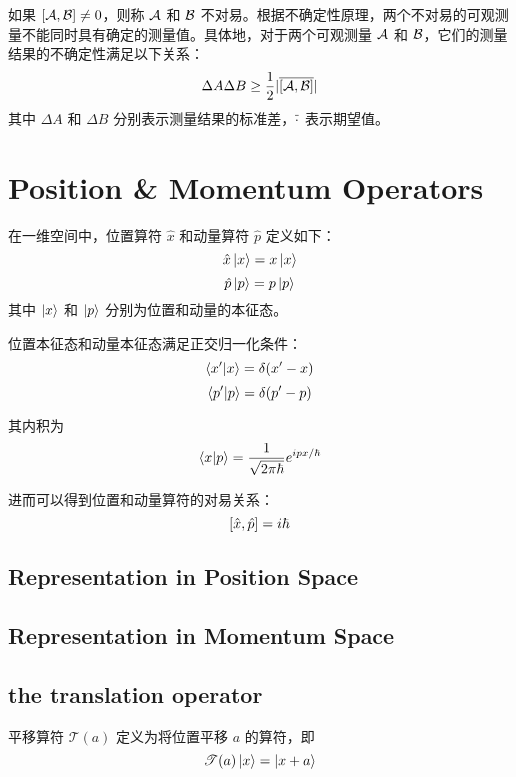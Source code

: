 如果 $\left[\mathcal{A},\mathcal{B}\right] \neq 0$，则称 $\mathcal{A}$ 和 $\mathcal{B}$ 不对易。根据不确定性原理，两个不对易的可观测量不能同时具有确定的测量值。具体地，对于两个可观测量 $\mathcal{A}$ 和 $\mathcal{B}$，它们的测量结果的不确定性满足以下关系：
\begin{equation}
    \Delta A \Delta B \geq \frac{1}{2} |\overline{\left[\mathcal{A},\mathcal{B}\right]}|
\end{equation}
其中 $\Delta A$ 和 $\Delta B$ 分别表示测量结果的标准差，$\overline{\cdot}$ 表示期望值。

\section{Position \& Momentum Operators}
在一维空间中，位置算符 $\hat{x}$ 和动量算符 $\hat{p}$ 定义如下：
\begin{equation}
    \hat{x}\left|x\right> = x\left|x\right>
\end{equation}
\begin{equation}
    \hat{p}\left|p\right> = p\left|p\right>
\end{equation}
其中 $\left|x\right>$ 和 $\left|p\right>$ 分别为位置和动量的本征态。

位置本征态和动量本征态满足正交归一化条件：
\begin{equation}
    \left<x'\middle|x\right> = \delta(x' - x)
\end{equation}
\begin{equation}
    \left<p'\middle|p\right> = \delta(p' - p)
\end{equation}

其内积为
\begin{equation}
    \left<x\middle|p\right> = \frac{1}{\sqrt{2\pi\hbar}} e^{ipx/\hbar}
\end{equation}

进而可以得到位置和动量算符的对易关系：
\begin{equation}
    \left[\hat{x},\hat{p}\right] = i\hbar
\end{equation}

\subsection{Representation in Position Space}

\subsection{Representation in Momentum Space}

\subsection{the translation operator}
平移算符 $\mathscr{T}(a)$ 定义为将位置平移 $a$ 的算符，即
\begin{equation}
    \mathscr{T}(a)\left|x\right> = \left|x + a\right>
\end{equation}